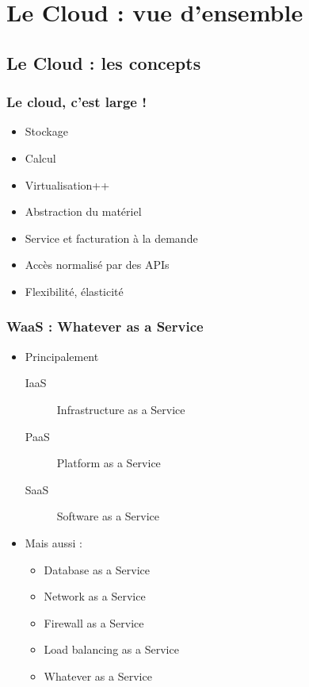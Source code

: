   \section[Cloud]{Le Cloud : vue d'ensemble}

  \subsection[Cloud]{Le Cloud : les concepts}

  \begin{frame}
    \frametitle{Le cloud, c'est large !}
    \begin{itemize}
      \item Stockage \pause
      \item Calcul \pause
      \item Virtualisation++\pause
      \item Abstraction du matériel\pause
      \item Service et facturation à la demande\pause
      \item \alert<8->{Accès normalisé par des APIs}\pause
      \item \alert<9->{Flexibilité, élasticité}
    \end{itemize}
  \end{frame}

  \begin{frame}
    \frametitle{WaaS : Whatever as a Service}
    \begin{itemize}
      \item Principalement\pause
      \begin{description}
        \item[IaaS] \alert<5->{Infrastructure as a Service}\pause
        \item[PaaS] Platform as a Service\pause
        \item[SaaS] Software as a Service\pause
      \end{description}
      \pause
      \item Mais aussi :
      \pause
      \begin{itemize}
        \item Database as a Service
        \item Network as a Service
        \item Firewall as a Service
        \item Load balancing as a Service\pause
        \item Whatever as a Service
      \end{itemize}
    \end{itemize}
  \end{frame}

